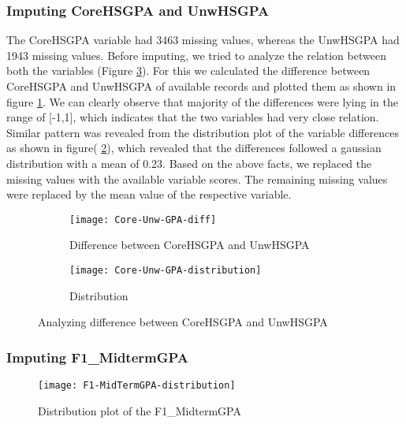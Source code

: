 \documentclass[11pt,openright]{report}
\begin{document}
\subsubsection {Imputing CoreHSGPA and UnwHSGPA}
The CoreHSGPA variable had 3463 missing values, whereas the UnwHSGPA had 1943 missing values. Before imputing, we tried to analyze the relation between both the variables (Figure \ref{fig:diffHSGPA}). For this we calculated the difference between CoreHSGPA and UnwHSGPA of available records and plotted them as shown in figure \ref{fig:Core_Unw_diff}. We can clearly observe that majority of the differences were lying in the range of [-1,1], which indicates that the two variables had very close relation. Similar pattern was revealed from the distribution plot of the variable differences as shown in figure( \ref{fig:Core_Unw_dist}), which revealed that the differences followed a gaussian distribution with a mean of 0.23. Based on the above facts, we replaced the missing values with the available variable scores. The remaining missing values were replaced by the mean value of the respective variable.


\begin{figure}[!htbp]
\centering
    \begin{subfigure}[b]{0.55\textwidth}            
            \texttt{[image: Core-Unw-GPA-diff]}
            \caption{Difference between CoreHSGPA and UnwHSGPA}
            \label{fig:Core_Unw_diff}
    \end{subfigure}%
    \begin{subfigure}[b]{0.55\textwidth}
            \centering
            \texttt{[image: Core-Unw-GPA-distribution]}
            \caption{Distribution }
            \label{fig:Core_Unw_dist}
    \end{subfigure}
    \caption{Analyzing difference between CoreHSGPA and UnwHSGPA }\label{fig:diffHSGPA}
\end{figure}

\subsubsection {Imputing F1\_MidtermGPA}

\begin{figure}[!ht]
	\centering
	\texttt{[image: F1-MidTermGPA-distribution]}
	\caption{Distribution plot of the F1\_MidtermGPA}
	\label{fig:F1_MidtermGPA_plot}
\end{figure}
\end{document}
